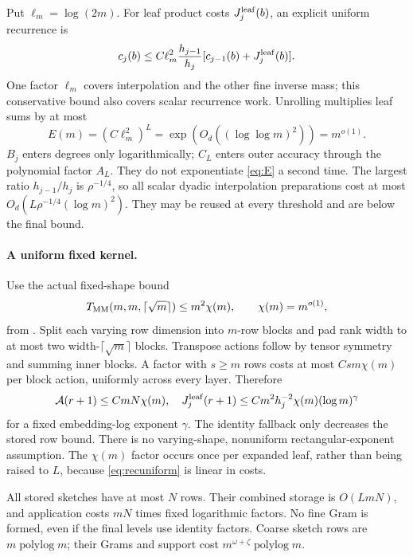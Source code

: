 \documentclass[11pt]{article}
\newcommand{\MM}{T_{\rm MM}}
\newcommand{\Ac}{\mathcal A}
\begin{document}
Put \(\ell_m=\log(2m)\). For leaf product costs \(J_j^{\rm leaf}(b)\),
an explicit uniform recurrence is
\begin{equation}\label{eq:recuniform}
 c_j(b)\leq C\ell_m^2\frac{h_{j-1}}{h_j}
                 [c_{j-1}(b)+J_j^{\rm leaf}(b)].
\end{equation}
One factor \(\ell_m\) covers interpolation and the other fine inverse
mass; this conservative bound also covers scalar recurrence work.
Unrolling multiplies leaf sums by at most
\begin{equation}\label{eq:E}
 E(m)=(C\ell_m^2)^L
        =\exp(O_d((\log\log m)^2))=m^{o(1)}.
\end{equation}
\(B_j\) enters degrees only logarithmically; \(C_L\) enters outer
accuracy through the polynomial factor \(A_L\). They do not exponentiate
\eqref{eq:E} a second time. The largest ratio \(h_{j-1}/h_j\) is
\(\rho^{-1/4}\), so all scalar dyadic interpolation preparations cost
at most \(O_d(L\rho^{-1/4}(\log m)^2)\). They may be reused at every
threshold and are below the final bound.

\paragraph{A uniform fixed kernel.}
Use the actual fixed-shape bound
\[
 \MM(m,m,\lceil\sqrt m\rceil)\leq m^2\chi(m),
 \qquad\chi(m)=m^{o(1)},
\]
from \cite{amanov}. Split each varying row dimension into \(m\)-row
blocks and pad rank width to at most two width-\(\lceil\sqrt m\rceil\)
blocks. Transpose actions follow by tensor symmetry and summing inner
blocks. A factor with \(s\geq m\) rows costs at most
\(Cs m\chi(m)\) per block action, uniformly across every layer.
Therefore
\begin{equation}\label{eq:kernels}
 \Ac(r+1)\leq CmN\chi(m),\quad
 J_j^{\rm leaf}(r+1)
   \leq Cm^2h_j^{-2}\chi(m)(\log m)^\gamma
\end{equation}
for a fixed embedding-log exponent \(\gamma\).
The identity fallback only decreases the stored row bound.
There is no varying-shape, nonuniform rectangular-exponent assumption.
The \(\chi(m)\) factor occurs once per expanded leaf, rather than
being raised to \(L\), because \eqref{eq:recuniform} is linear in costs.

All stored sketches have at most \(N\) rows. Their combined storage
is \(O(LmN)\), and application costs \(mN\) times fixed logarithmic
factors. No fine Gram is formed, even if the final levels use identity
factors. Coarse sketch rows are \(m\operatorname{polylog}m\); their
Grams and support cost \(m^{\omega+\zeta}\operatorname{polylog}m\).
\end{document}
